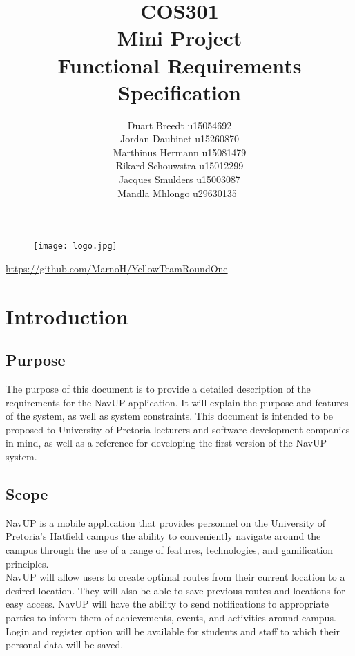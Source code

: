 \documentclass[12pt]{article}
\begin{document}
	

	\begin{figure}
		\texttt{[image: logo.jpg]}	
	\end{figure}

	\title 	{
				COS301\\
				Mini Project\\
				Functional Requirements Specification
		   	}
	\author {
				Duart Breedt u15054692\\
				Jordan Daubinet u15260870\\
				Marthinus Hermann u15081479\\
				Rikard Schouwstra u15012299\\
				Jacques Smulders u15003087\\
				Mandla Mhlongo u29630135\
			}
	\maketitle
	\begin{center}
			\url{https://github.com/MarnoH/YellowTeamRoundOne}	
	\end{center}
	\newpage
	\tableofcontents
	\newpage
	\section{Introduction}
		
	\subsection{Purpose}
		The purpose of this document is to provide a detailed description of the requirements for the NavUP application. It will explain the purpose and features of the system, as well as system constraints.
This document is intended to be proposed to University of Pretoria lecturers and software development companies in mind, as well as a reference for developing the first version of the NavUP system.
		
	\subsection{Scope}
		NavUP is a mobile application that provides personnel on the University of Pretoria’s Hatfield campus the ability to conveniently navigate around the campus through the use of a range of features, technologies, and gamification principles.\\

NavUP will allow users to create optimal routes from their current location to a desired location. They will also be able to save previous routes and locations for easy access. NavUP will have the ability to send notifications to appropriate parties to inform them of achievements, events, and activities around campus. Login and register option will be available for students and staff to which their personal data will be saved.\\
\end{document}
